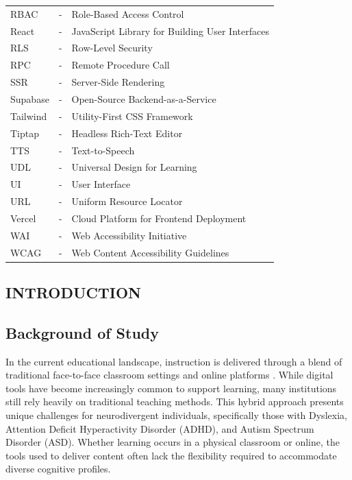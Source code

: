 \documentclass[12pt, oneside]{article} %
\newcommand{\tabbreak}{\hyphenpenalty=200\exhyphenpenalty=200\tolerance=4000\hbadness=10000\hspace{0pt}}
\begin{document}
\begin{tabular}{>{\raggedright\arraybackslash\tabbreak}p{2.27cm} >{\centering\arraybackslash\tabbreak}m{0.45cm} >{\raggedright\arraybackslash\tabbreak}p{11.0cm}}
RBAC & - & Role-Based Access Control \\
React & - & JavaScript Library for Building User Interfaces \\
RLS & - & Row-Level Security \\
RPC & - & Remote Procedure Call \\
SSR & - & Server-Side Rendering \\
Supabase & - & Open-Source Backend-as-a-Service \\
Tailwind & - & Utility-First CSS Framework \\
Tiptap & - & Headless Rich-Text Editor \\
TTS & - & Text-to-Speech \\
UDL & - & Universal Design for Learning \\
UI & - & User Interface \\
URL & - & Uniform Resource Locator \\
Vercel & - & Cloud Platform for Frontend Deployment \\
WAI & - & Web Accessibility Initiative \\
WCAG & - & Web Content Accessibility Guidelines \\
\end{tabular}

\vfill \null
\newpage


\clearpage
{}
\setcounter{page}{1}

\setlength{\parindent}{30pt}



\newpage
\vfill \null
\thispagestyle{empty}
\begin{center}
\section{INTRODUCTION}
\end{center}
\vspace{2cm}

\subsection{Background of Study}

In the current educational landscape, instruction is delivered through a blend of traditional face-to-face classroom settings and online platforms \cite{prensky2001digital}. While digital tools have become increasingly common to support learning, many institutions still rely heavily on traditional teaching methods. This hybrid approach presents unique challenges for neurodivergent individuals, specifically those with Dyslexia, Attention Deficit Hyperactivity Disorder (ADHD), and Autism Spectrum Disorder (ASD). Whether learning occurs in a physical classroom or online, the tools used to deliver content often lack the flexibility required to accommodate diverse cognitive profiles.
\end{document}

